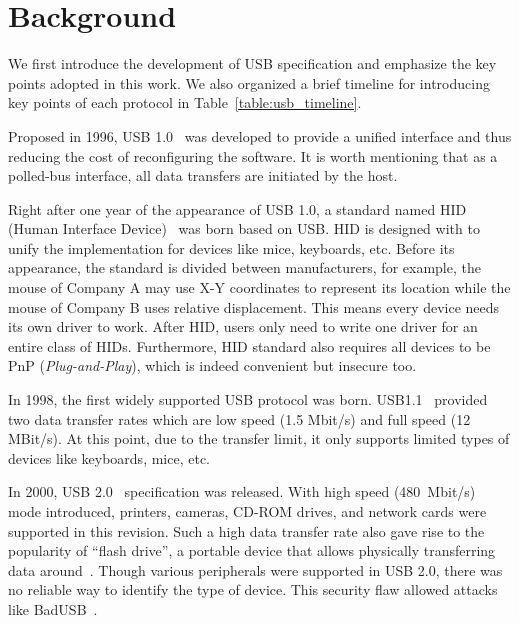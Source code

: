 \section{Background}
\label{sec:background}

We first introduce the development of USB specification and emphasize the key
points adopted in this work. We also organized a brief timeline for introducing
key points of each protocol in Table~\ref{table:usb_timeline}.

Proposed in 1996, USB 1.0~\cite{usb10} was developed to provide a unified
interface and thus reducing the cost of reconfiguring the software. It is
worth mentioning that as a polled-bus interface, all data transfers are
initiated by the host.

Right after one year of the appearance of USB 1.0, a standard named HID (Human
Interface Device)~\cite{hid} was born based on USB. HID is
designed with to unify the implementation for devices like mice,
keyboards, etc. Before its appearance, the standard is divided between
manufacturers, for example, the mouse of Company A may use X-Y coordinates to
represent its location while the mouse of Company B uses relative displacement.
This means every device needs its own driver to work. After HID, users only need to
write one driver for an entire class of HIDs. Furthermore, HID standard also
requires all devices to be PnP (\emph{Plug-and-Play}), which is indeed
convenient but insecure too.

In 1998, the first widely supported USB protocol was born. USB1.1~\cite{usb11}
provided two data transfer rates which are low speed (1.5 Mbit/s) and full
speed (12 MBit/s). At this point, due to the transfer limit, it only supports
limited types of devices like keyboards, mice, etc.

In 2000, USB 2.0~\cite{usb20} specification was released. With high speed \mbox{(480
Mbit/s)} mode introduced, printers, cameras, CD-ROM drives, and network cards were
supported in this revision. Such a high data transfer rate also gave rise to the
popularity of ``flash drive'', a portable device that allows physically
transferring data around~\cite{sok}. Though various peripherals were supported
in USB 2.0, there was no reliable way to identify the type of device. This
security flaw allowed attacks like BadUSB~\cite{badusb,rubber}.

